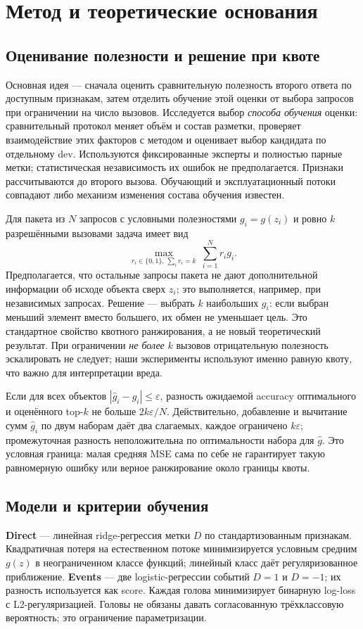 \section{Метод и теоретические основания}\label{sec:method}
\subsection{Оценивание полезности и решение при квоте}
Основная идея --- сначала оценить сравнительную полезность второго
ответа по доступным признакам, затем отделить обучение этой оценки
от выбора запросов при ограничении на число вызовов.
Исследуется выбор \emph{способа обучения} оценки: сравнительный
протокол меняет объём и состав разметки, проверяет взаимодействие
этих факторов с методом и оценивает выбор кандидата по отдельному dev.
Используются фиксированные эксперты и полностью парные метки;
статистическая независимость их ошибок не предполагается.
Признаки рассчитываются до второго вызова. Обучающий и эксплуатационный
потоки совпадают либо механизм изменения состава обучения известен.

Для пакета из $N$ запросов с условными полезностями $g_i=g(z_i)$
и ровно $k$ разрешёнными вызовами задача имеет вид
\begin{equation}\label{eq:topk}
\max_{r_i\in\{0,1\},\,\sum_i r_i=k}\ \sum_{i=1}^{N}r_i g_i.
\end{equation}
Предполагается, что остальные запросы пакета не дают дополнительной
информации об исходе объекта сверх $z_i$; это выполняется, например,
при независимых запросах. Решение --- выбрать $k$ наибольших $g_i$:
если выбран меньший элемент вместо большего, их обмен не уменьшает
цель. Это стандартное свойство квотного ранжирования, а не новый
теоретический результат. При ограничении \emph{не более} $k$ вызовов
отрицательную полезность эскалировать не следует; наши эксперименты
используют именно равную квоту, что важно для интерпретации вреда.

Если для всех объектов $|\widehat g_i-g_i|\le\varepsilon$,
разность ожидаемой accuracy оптимального и оценённого top-$k$ не больше
$2k\varepsilon/N$. Действительно, добавление и вычитание сумм
$\widehat g_i$ по двум наборам даёт два слагаемых, каждое ограничено
$k\varepsilon$; промежуточная разность неположительна по оптимальности
набора для $\widehat g$. Это условная граница: малая средняя MSE сама
по себе не гарантирует такую равномерную ошибку или верное ранжирование
около границы квоты.

\subsection{Модели и критерии обучения}
\textbf{Direct} --- линейная ridge-регрессия метки $D$ по
стандартизованным признакам. Квадратичная потеря на естественном потоке
минимизируется условным средним $g(z)$ в неограниченном классе функций;
линейный класс даёт регуляризованное приближение.
\textbf{Events} --- две logistic-регрессии событий $D=1$ и $D=-1$;
их разность используется как score. Каждая голова минимизирует
бинарную log-loss с L2-регуляризацией. Головы не обязаны давать
согласованную трёхклассовую вероятность; это ограничение параметризации.

